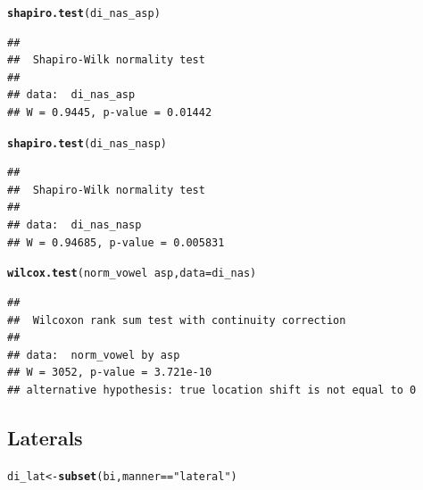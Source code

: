 \documentclass[a4paper,11pt]{article}\usepackage[]{graphicx}\usepackage[]{color}
\makeatletter
\newcommand{\hlstr}[1]{\textcolor[rgb]{0.192,0.494,0.8}{#1}}%
\newcommand{\hlopt}[1]{\textcolor[rgb]{0,0,0}{#1}}%
\newcommand{\hlstd}[1]{\textcolor[rgb]{0.345,0.345,0.345}{#1}}%
\newcommand{\hlkwb}[1]{\textcolor[rgb]{0.69,0.353,0.396}{#1}}%
\newcommand{\hlkwc}[1]{\textcolor[rgb]{0.333,0.667,0.333}{#1}}%
\newcommand{\hlkwd}[1]{\textcolor[rgb]{0.737,0.353,0.396}{\textbf{#1}}}%
\newenvironment{kframe}{%
 \def\at@end@of@kframe{}%
 \ifinner\ifhmode%
  \def\at@end@of@kframe{\end{minipage}}%
  \begin{minipage}{\columnwidth}%
 \fi\fi%
 \def\FrameCommand##1{\hskip\@totalleftmargin \hskip-\fboxsep
 \colorbox{shadecolor}{##1}\hskip-\fboxsep
     \hskip-\linewidth \hskip-\@totalleftmargin \hskip\columnwidth}%
 \MakeFramed {\advance\hsize-\width
   \@totalleftmargin\z@ \linewidth\hsize
   \@setminipage}}%
 {\par\unskip\endMakeFramed%
 \at@end@of@kframe}
\newenvironment{knitrout}{}{} %
\makeatother
\begin{document}
\begin{knitrout}
\color{fgcolor}\begin{kframe}
\begin{alltt}
\hlkwd{shapiro.test}\hlstd{(di_nas_asp)}
\end{alltt}
\begin{verbatim}
## 
## 	Shapiro-Wilk normality test
## 
## data:  di_nas_asp
## W = 0.9445, p-value = 0.01442
\end{verbatim}
\begin{alltt}
\hlkwd{shapiro.test}\hlstd{(di_nas_nasp)}
\end{alltt}
\begin{verbatim}
## 
## 	Shapiro-Wilk normality test
## 
## data:  di_nas_nasp
## W = 0.94685, p-value = 0.005831
\end{verbatim}
\begin{alltt}
\hlkwd{wilcox.test}\hlstd{(norm_vowel} \hlopt{~} \hlstd{asp,} \hlkwc{data} \hlstd{= di_nas)}
\end{alltt}
\begin{verbatim}
## 
## 	Wilcoxon rank sum test with continuity correction
## 
## data:  norm_vowel by asp
## W = 3052, p-value = 3.721e-10
## alternative hypothesis: true location shift is not equal to 0
\end{verbatim}
\end{kframe}
\end{knitrout}

\subsection{Laterals}

\begin{knitrout}
\color{fgcolor}\begin{kframe}
\begin{alltt}
\hlstd{di_lat} \hlkwb{<-} \hlkwd{subset}\hlstd{(bi, manner} \hlopt{==} \hlstr{"lateral"}\hlstd{)}
\end{alltt}
\end{kframe}
\end{knitrout}
\end{document}
